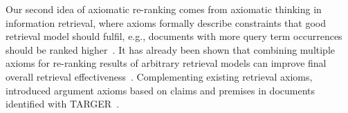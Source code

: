 Our second idea of axiomatic re-ranking comes from axiomatic thinking in information retrieval, where axioms formally describe constraints that good retrieval model should fulfil, e.g., documents with more query term occurrences should be ranked higher~\citet{FangTZ2004}. It has already been shown that combining multiple axioms for re-ranking results of arbitrary retrieval models can improve final overall retrieval effectiveness~\cite{HagenVGS2016}. Complementing existing retrieval axioms, \citet{BondarenkoHVSPB2018} introduced argument axioms based on claims and premises in documents identified with TARGER~\cite{ChernodubOHBHBP2019}.

